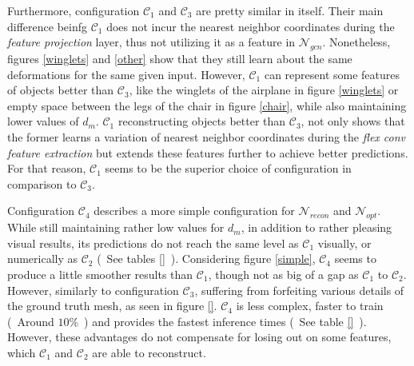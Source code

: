   Furthermore, configuration $\mathcal{C}_1$ and $\mathcal{C}_3$ are pretty similar in itself. Their main difference beinfg $\mathcal{C}_1$ does not 
  incur the nearest neighbor coordinates during the \emph{feature projection} layer, thus not utilizing it as a feature in $\mathcal{N}_{gcn}$.
  Nonetheless, figures \ref{winglets} and \ref{other} show that they still learn about the same deformations for the same given input. However,
  $\mathcal{C}_1$ can represent some features of objects better than $\mathcal{C}_3$, like the winglets of the airplane in figure \ref{winglets}
  or empty space between the legs of the chair in figure \ref{chair}, while also maintaining lower values of $d_m$. $\mathcal{C}_1$ reconstructing
  objects better than $\mathcal{C}_3$, not only shows that the former learns a variation of nearest neighbor coordinates during the
  \emph{flex conv feature extraction} but extends these features further to achieve better predictions. For that reason, $\mathcal{C}_1$ seems to be the 
  superior choice of configuration in comparison to $\mathcal{C}_3$.


  Configuration $\mathcal{C}_4$ describes a more simple configuration for $\mathcal{N}_{recon}$ and $\mathcal{N}_{opt}$. While still maintaining rather
  low values for $d_m$, in addition to rather pleasing visual results, its predictions do not reach the same level as $\mathcal{C}_1$ visually, or numerically
  as $\mathcal{C}_2$ (~See tables \ref{}~). 
  Considering figure \ref{simple}, $\mathcal{C}_4$ seems to produce a little smoother results than $\mathcal{C}_1$, though not as big of a gap as $\mathcal{C}_1$ 
  to $\mathcal{C}_2$. However, similarly to configuration $\mathcal{C}_3$, suffering from forfeiting various details of the ground truth mesh, as seen in figure
  \ref{}. $\mathcal{C}_4$ is less complex, faster to train (~Around $10\%$~) and provides the fastest inference times (~See table \ref{}~). However, 
  these advantages do not compensate for losing out on some features, which $\mathcal{C}_1$ and $\mathcal{C}_2$ are able to reconstruct.

